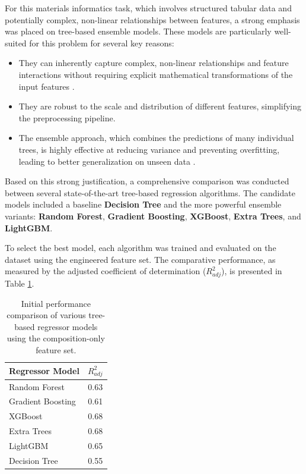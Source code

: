 For this materials informatics task, which involves structured tabular data and potentially complex, non-linear relationships between features, a strong emphasis was placed on tree-based ensemble models. These models are particularly well-suited for this problem for several key reasons:
\begin{itemize}
    \item They can inherently capture complex, non-linear relationships and feature interactions without requiring explicit mathematical transformations of the input features \cite{Breiman2001}.
    \item They are robust to the scale and distribution of different features, simplifying the preprocessing pipeline.
    \item The ensemble approach, which combines the predictions of many individual trees, is highly effective at reducing variance and preventing overfitting, leading to better generalization on unseen data \cite{Friedman2001}.
\end{itemize}

Based on this strong justification, a comprehensive comparison was conducted between several state-of-the-art tree-based regression algorithms. The candidate models included a baseline \textbf{Decision Tree} and the more powerful ensemble variants: \textbf{Random Forest}, \textbf{Gradient Boosting}, \textbf{XGBoost}, \textbf{Extra Trees}, and \textbf{LightGBM}.

To select the best model, each algorithm was trained and evaluated on the dataset using the engineered feature set. The comparative performance, as measured by the adjusted coefficient of determination (\(R^2_{adj}\)), is presented in Table \ref{tab:model_comparison}.

\begin{table}[h!]
\centering
\caption{Initial performance comparison of various tree-based regressor models using the composition-only feature set.}
\label{tab:model_comparison}
\begin{tabular}{lc}
\hline
\textbf{Regressor Model} & \textbf{\(R^2_{adj}\)} \\
\hline
Random Forest            & 0.63                 \\
Gradient Boosting        & 0.61                 \\
XGBoost                  & 0.68                 \\
Extra Trees              & 0.68                 \\
LightGBM                 & 0.65                 \\
Decision Tree            & 0.55                 \\
\hline
\end{tabular}
\end{table}

